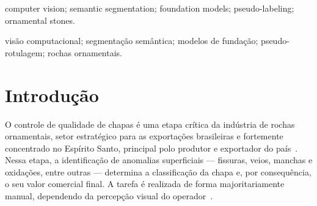 \documentclass[10pt,conference]{IEEEtran}
\begin{document}
\renewcommand{\IEEEkeywordsname}{Keywords}
\begin{IEEEkeywords}
computer vision; semantic segmentation; foundation models; pseudo-labeling; ornamental stones.
\end{IEEEkeywords}

\renewcommand{\abstractname}{Resumo}
\begin{abstract}
A inspeção de anomalias superficiais em chapas de rochas ornamentais é majoritariamente manual, subjetiva e de difícil padronização, e a classificação dela derivada define o valor comercial da chapa. Este artigo apresenta o ARIA (Análise e Reconhecimento Inteligente de Anomalias), um \textit{pipeline} hierárquico de visão computacional no qual uma classificação taxonômica prévia restringe o domínio visual de um segmentador \textit{Teacher-Student}: o \textit{Segment Anything Model} (SAM), guiado por \textit{prompts} textuais calibrados por litologia, gera anotações (\textit{pseudo-labels}) que treinam modelos especialistas YOLO11-seg. A hipótese de trabalho é que essa especialização reduz falsos positivos frente a um modelo generalista monolítico. Os resultados preliminares, obtidos sobre uma única litologia de um conjunto de dados industriais reais, mostram que o modelo de fundação segmenta anomalias relevantes em regime \textit{zero-shot} quando guiado por \textit{prompts} calibrados, sustentando a viabilidade da anotação automatizada sem rotulagem manual extensiva.
\end{abstract}

\renewcommand{\IEEEkeywordsname}{Palavras-chave}
\begin{IEEEkeywords}
visão computacional; segmentação semântica; modelos de fundação; pseudo-rotulagem; rochas ornamentais.
\end{IEEEkeywords}

\IEEEpeerreviewmaketitle

\section{Introdução}

O controle de qualidade de chapas é uma etapa crítica da indústria de rochas ornamentais, setor estratégico para as exportações brasileiras e fortemente concentrado no Espírito Santo, principal polo produtor e exportador do país~\cite{stone_economy_bahiense2023}. Nessa etapa, a identificação de anomalias superficiais --- fissuras, veios, manchas e oxidações, entre outras --- determina a classificação da chapa e, por consequência, o seu valor comercial final. A tarefa é realizada de forma majoritariamente manual, dependendo da percepção visual do operador~\cite{stone_inspection_vidal2013}.
\end{document}
